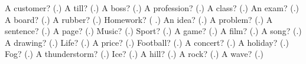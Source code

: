 \begin{tcolorbox}[breakable,colback=teal!4,colframe=teal!35!black,title={Before you move on}]
A customer? (\textbf{}.) A till? (\textbf{}.) A boss? (\textbf{}.) A profession? (\textbf{}.) A class? (\textbf{}.) An exam? (\textbf{}.) A board? (\textbf{}.) A rubber? (\textbf{}.) Homework? (\textbf{ }.) An idea? (\textbf{}.) A problem? (\textbf{}.) A sentence? (\textbf{}.) A page? (\textbf{}.) Music? (\textbf{}.) Sport? (\textbf{}.) A game? (\textbf{}.) A film? (\textbf{}.) A song? (\textbf{}.) A drawing? (\textbf{}.) Life? (\textbf{}.) A price? (\textbf{}.) Football? (\textbf{}.) A concert? (\textbf{}.) A holiday? (\textbf{}.) Fog? (\textbf{}.) A thunderstorm? (\textbf{}.) Ice? (\textbf{}.) A hill? (\textbf{}.) A rock? (\textbf{}.) A wave? (\textbf{}.)
\end{tcolorbox}

